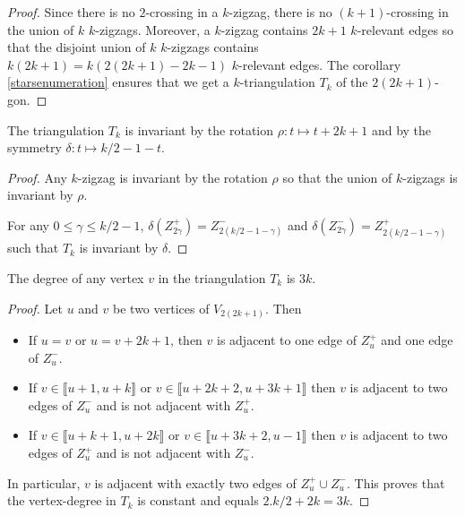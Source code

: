\documentclass[12pt]{amsart}
\begin{document}
\begin{proof}
Since there is no $2$-crossing in a $k$-zigzag, there is no $(k+1)$-crossing in the union of $k$ $k$-zigzags. Moreover, a $k$-zigzag contains $2k+1$ $k$-relevant edges so that the disjoint union of $k$ $k$-zigzags contains $k(2k+1)=k(2(2k+1)-2k-1)$ $k$-relevant edges. The corollary \ref{starsenumeration} ensures that we get a $k$-triangulation $T_k$ of the $2(2k+1)$-gon.
\end{proof}

\begin{lemma}
The triangulation $T_k$ is invariant by the rotation $\rho: t\mapsto t+2k+1$ and by the symmetry $\delta: t\mapsto k/2-1-t$.
\end{lemma}

\begin{proof}
Any $k$-zigzag is invariant by the rotation $\rho$ so that the union of $k$-zigzags is invariant by $\rho$.

For any $0\le\gamma\le k/2-1$, $\delta(Z^+_{2\gamma})=Z^-_{2(k/2-1-\gamma)}$ and $\delta(Z^-_{2\gamma})=Z^+_{2(k/2-1-\gamma)}$ such that $T_k$ is invariant by $\delta$.
\end{proof}

\begin{lemma}
The degree of any vertex $v$ in the triangulation $T_k$ is $3k$.
\end{lemma}

\begin{proof}
Let $u$ and $v$ be two vertices of $V_{2(2k+1)}$. Then
\begin{itemize}
\item If $u=v$ or $u=v+2k+1$, then $v$ is adjacent to one edge of $Z_u^+$ and one edge of $Z_u^-$.
\item If $v\in\llbracket u+1,u+k\rrbracket$ or $v\in\llbracket u+2k+2,u+3k+1\rrbracket$ then $v$ is adjacent to two edges of $Z_u^-$ and is not adjacent with $Z_u^+$.
\item If $v\in\llbracket u+k+1,u+2k\rrbracket$ or $v\in\llbracket u+3k+2,u-1\rrbracket$ then $v$ is adjacent to two edges of $Z_u^+$ and is not adjacent with $Z_u^-$.
\end{itemize}
In particular, $v$ is adjacent with exactly two edges of $Z_u^+\cup Z_u^-$. This proves that the vertex-degree in $T_k$ is constant and equals $2.k/2+2k=3k$.
\end{proof}
\end{document}
